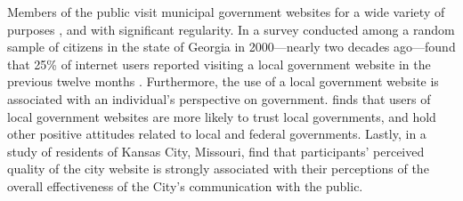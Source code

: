 \documentclass[11pt]{article}
\begin{document}
Members of the public visit municipal government websites for a wide variety of purposes \citet{sandoval2012government}, and with significant regularity. In a survey conducted among a random sample of citizens in the state of Georgia in 2000---nearly two decades ago---found that 25\% of internet users reported visiting a local government website in the previous twelve months \citep{thomas2003new}. Furthermore, the use of a local government website is associated with an individual's perspective on government. \citet{tolbert2006effects} finds that users of local government websites are more likely to trust local governments, and hold other positive attitudes related to local and federal governments. Lastly, in a study of residents of Kansas City, Missouri, \citet{ho2017government} find that participants' perceived quality of the city website is strongly associated with their perceptions of the overall effectiveness of the City's communication with the public.
\end{document}
